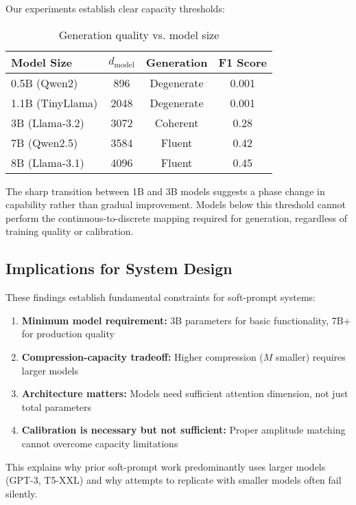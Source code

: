 \documentclass{article}
\begin{document}
Our experiments establish clear capacity thresholds:

\begin{table}[h]
\caption{Generation quality vs. model size}
\label{tab:size_threshold}
\vskip 0.15in
\begin{center}
\begin{small}
\begin{tabular}{lccc}
\toprule
Model Size & $d_{\text{model}}$ & Generation & F1 Score \\
\midrule
0.5B (Qwen2) & 896 & Degenerate & 0.001 \\
1.1B (TinyLlama) & 2048 & Degenerate & 0.001 \\
3B (Llama-3.2) & 3072 & Coherent & 0.28 \\
7B (Qwen2.5) & 3584 & Fluent & 0.42 \\
8B (Llama-3.1) & 4096 & Fluent & 0.45 \\
\bottomrule
\end{tabular}
\end{small}
\end{center}
\vskip -0.1in
\end{table}

The sharp transition between 1B and 3B models suggests a phase change in capability rather than gradual improvement. Models below this threshold cannot perform the continuous-to-discrete mapping required for generation, regardless of training quality or calibration.

\subsection{Implications for System Design}

These findings establish fundamental constraints for soft-prompt systems:
\begin{enumerate}
\item \textbf{Minimum model requirement:} 3B parameters for basic functionality, 7B+ for production quality
\item \textbf{Compression-capacity tradeoff:} Higher compression ($M$ smaller) requires larger models
\item \textbf{Architecture matters:} Models need sufficient attention dimension, not just total parameters
\item \textbf{Calibration is necessary but not sufficient:} Proper amplitude matching cannot overcome capacity limitations
\end{enumerate}

This explains why prior soft-prompt work predominantly uses larger models (GPT-3, T5-XXL) and why attempts to replicate with smaller models often fail silently.
\end{document}

